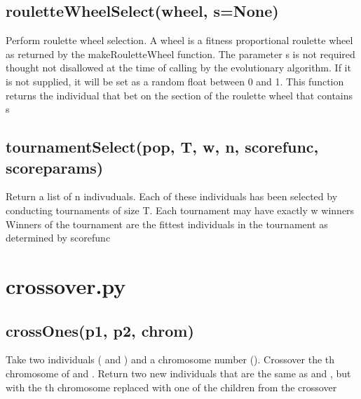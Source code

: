\documentclass[letterpaper,10pt,english]{sphinxmanual}
\begin{document}
\section{rouletteWheelSelect(wheel, s=None)}
\label{selection.py:roulettewheelselect-wheel-s-none}
Perform roulette wheel selection. A wheel is a fitness proportional roulette wheel as returned by the makeRouletteWheel function.
The parameter s is not required thought not disallowed at the time of calling by the evolutionary algorithm. If it is not supplied, it will be set as a random float between 0 and 1.
This function returns the individual that bet on the section of the roulette wheel that contains s


\section{tournamentSelect(pop, T, w, n, scorefunc, scoreparams)}
\label{selection.py:tournamentselect-pop-t-w-n-scorefunc-scoreparams}
Return a list of n indivuduals.
Each of these individuals has been selected by conducting tournaments of size T.
Each tournament may have exactly w winners
Winners of the tournament are the fittest individuals in the tournament as determined by scorefunc


\chapter{crossover.py}
\label{crossover.py:crossover-py}\label{crossover.py::doc}

\section{crossOnes(p1, p2, chrom)}
\label{crossover.py:crossones-p1-p2-chrom}
Take two individuals ( and  ) and a chromosome number ().
Crossover the  th chromosome of  and .
Return two new individuals that are the same as  and  , but with the  th chromosome replaced with one of the children from the crossover
\end{document}
